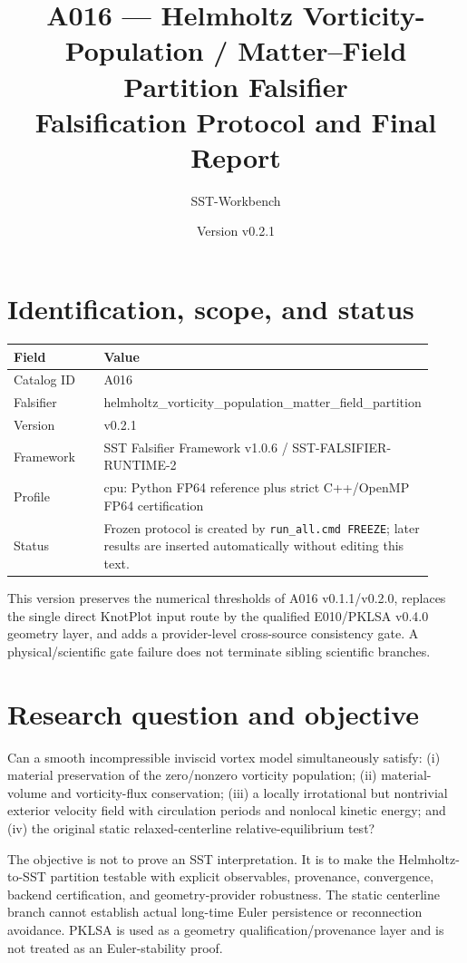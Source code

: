 \documentclass[11pt,a4paper]{article}
\title{A016 --- Helmholtz Vorticity-Population / Matter--Field Partition Falsifier\\Falsification Protocol and Final Report}
\author{SST-Workbench}
\date{Version v0.2.1}
\begin{document}
\maketitle

\section{Identification, scope, and status}
\begin{longtable}{p{0.30\linewidth}p{0.62\linewidth}}
\toprule
Field & Value \\
\midrule
Catalog ID & A016 \\
Falsifier & helmholtz\_vorticity\_population\_matter\_field\_partition \\
Version & v0.2.1 \\
Framework & SST Falsifier Framework v1.0.6 / SST-FALSIFIER-RUNTIME-2 \\
Profile & cpu: Python FP64 reference plus strict C++/OpenMP FP64 certification \\
Status & Frozen protocol is created by \texttt{run\_all.cmd FREEZE}; later results are inserted automatically without editing this text. \\
\bottomrule
\end{longtable}
This version preserves the numerical thresholds of A016 v0.1.1/v0.2.0, replaces the single direct KnotPlot input route by the qualified E010/PKLSA v0.4.0 geometry layer, and adds a provider-level cross-source consistency gate. A physical/scientific gate failure does not terminate sibling scientific branches.

\section{Research question and objective}
Can a smooth incompressible inviscid vortex model simultaneously satisfy: (i) material preservation of the zero/nonzero vorticity population; (ii) material-volume and vorticity-flux conservation; (iii) a locally irrotational but nontrivial exterior velocity field with circulation periods and nonlocal kinetic energy; and (iv) the original static relaxed-centerline relative-equilibrium test?

The objective is not to prove an SST interpretation. It is to make the Helmholtz-to-SST partition testable with explicit observables, provenance, convergence, backend certification, and geometry-provider robustness. The static centerline branch cannot establish actual long-time Euler persistence or reconnection avoidance. PKLSA is used as a geometry qualification/provenance layer and is not treated as an Euler-stability proof.
\end{document}
